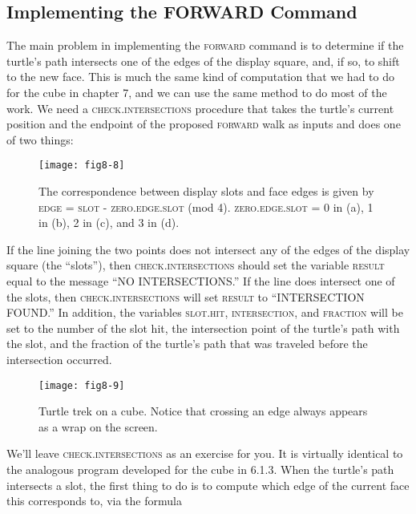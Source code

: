 \documentclass{book}
\begin{document}
\subsection{Implementing the FORWARD Command}

The main problem in implementing the \textsc{forward} command is to determine if the turtle's path intersects one of the edges of the display square,
and, if so, to shift to the new face. This is much the same kind of computation that we had to do for the cube in chapter 7, and we can use the
same method to do most of the work. We need a \textsc{check}\textsc{.intersections}
procedure that takes the turtle's current position and the endpoint of
the proposed \textsc{forward} walk as inputs and does one of two things:

\begin{figure}
\begin{center}
\texttt{[image: fig8-8]}
\caption{The correspondence between display slots and face edges is given by \textsc{edge} = \textsc{slot} - \textsc{zero}\textsc{.edge}.\textsc{slot} (mod 4). \textsc{zero}\textsc{.edge}\textsc{.slot} = 0 in (a), 1 in (b), 2 in (c), and 3 in (d).}
\end{center}
\end{figure}

If the line joining the two points does not intersect any of the edges of
the display square (the ``slots''), then \textsc{check}\textsc{.intersections} should set
the variable \textsc{result} equal to the message ``NO INTERSECTIONS.''
If the line does intersect one of the slots, then \textsc{check}\textsc{.intersections}
will set \textsc{result} to ``INTERSECTION FOUND.'' In addition, the variables
\textsc{slot}\textsc{.hit}, \textsc{intersection}, and \textsc{fraction} will be set to the number of
the slot hit, the intersection point of the turtle's path with the slot, and
the fraction of the turtle's path that was traveled before the intersection
occurred.

\begin{figure}
\begin{center}
\texttt{[image: fig8-9]}
\caption{Turtle trek on a cube. Notice that crossing an edge always appears as a wrap on the screen.}
\end{center}
\end{figure}

We'll leave \textsc{check}\textsc{.intersections} as an exercise for you. It is virtually
identical to the analogous program developed for the cube in 6.1.3.
When the turtle's path intersects a slot, the first thing to do is to
compute which edge of the current face this corresponds to, via the
formula
\end{document}
